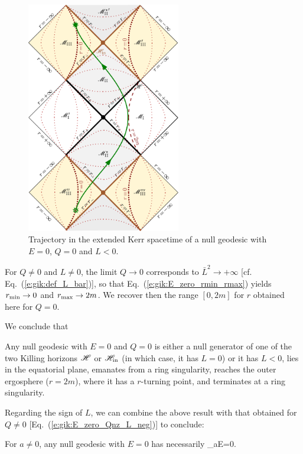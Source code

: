 \begin{figure}
\centerline{\includegraphics[width=0.6\textwidth]{gik_zero_ener_traj_q0.pdf}}
\caption[]{\label{f:gik:zero_ener_traj_q0} \footnotesize
Trajectory in the extended Kerr spacetime of a null geodesic
with $E=0$, $Q=0$ and $L<0$.
}
\end{figure}


\begin{remark}
For $Q\neq 0$ and $L\neq 0$, the limit $Q\to 0$ corresponds to
$\bar{L}^2 \to +\infty$ [cf. Eq.~(\ref{e:gik:def_L_bar})], so that
Eq.~(\ref{e:gik:E_zero_rmin_rmax}) yields
$r_{\rm min}\to 0$ and $r_{\rm max}\to 2m$.
We recover then the range $[0, 2m]$ for $r$ obtained here for $Q=0$.
\end{remark}


We conclude that
\begin{greybox}
Any null geodesic with $E=0$ and $Q=0$
is either a null generator of one of the two Killing horizons
$\mathscr{H}$ or $\mathscr{H}_{\rm in}$ (in which case, it has $L=0$) or it has
$L < 0$, lies in the equatorial plane,
emanates from a ring singularity, reaches the outer ergosphere ($r=2m$),
where it has a $r$-turning point, and terminates at a ring singularity.
\end{greybox}

Regarding the sign of $L$, we can combine the above result with that
obtained for $Q\neq 0$ [Eq.~(\ref{e:gik:E_zero_Qnz_L_neg})] to conclude:
\begin{greybox}
For $a\neq 0$, any null geodesic with $E=0$ has necessarily
\be
    _{{a\atop E=0}}.
\ee
\end{greybox}

